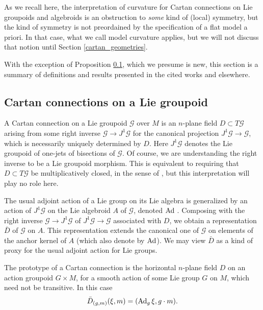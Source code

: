 \documentclass[leqno,12pt]{amsart} %
\begin{document}
As we recall here, the interpretation of curvature for Cartan connections on Lie groupoids
and algebroids is an obstruction to {\em some} kind of (local) symmetry, but the kind of
symmetry is not preordained by the specification of a flat model a priori. In that case,
what we call {\df model curvature} applies, but we will not discuss that notion until
Section \ref{cartan_geometries}.

With the exception of Proposition \ref{cartan}, which we presume is new, this section is a
summary of definitions and results presented in the cited works and elsewhere.

\subsection{Cartan connections on a Lie groupoid}\label{cartan}%
A {\df Cartan connection} on a Lie groupoid ${\mathcal G} $ over $M$ is an $n$-plane field
$D \subset T {\mathcal G}$ arising from some right inverse
${\mathcal G} \rightarrow J^1 {\mathcal G} $ for the canonical projection
$J^1 {\mathcal G} \rightarrow {\mathcal G} $, which is necessarily uniquely determined by
$D$. Here $J^1 {\mathcal G} $ denotes the Lie groupoid of one-jets of bisections of
${\mathcal G} $. Of course, we are understanding the right inverse to be a Lie groupoid
morphism. This is equivalent to requiring that $D \subset T {\mathcal G}$ be
multiplicatively closed, in the sense of \cite{Salazar_13,Crainic_etal_15}, but this
interpretation will play no role here.

The usual adjoint action of a Lie group on its Lie algebra is generalized by an action of
$J^1 {\mathcal G} $ on the Lie algebroid $A$ of ${\mathcal G} $, denoted $\operatorname{Ad}$
\cite{Blaom_16b}. Composing with the right inverse
${\mathcal G} \rightarrow J^1 {\mathcal G} $ of
$J^1 {\mathcal G} \rightarrow {\mathcal G} $ associated with $D$, we obtain a
representation $\bar D$ of ${\mathcal G}$ on $A$. This representation extends the
canonical one of ${\mathcal G} $ on elements of the anchor kernel of $A$ (which also
denote by $\operatorname{Ad}$). We may view $\bar D$ as a kind of proxy for the usual adjoint
action for Lie groups.

The prototype of a Cartan connection is the horizontal $n$-plane field $D$ on
an action groupoid $G \times M$, for a smooth action of some Lie group $ G $ on
$M$, which need not be transitive. In this case
\begin{equation}
  \bar D_{(g, m)}(\xi, m) = (\operatorname{Ad}_g \xi, g\cdot m).\label{adjoint}
\end{equation}
\end{document}
